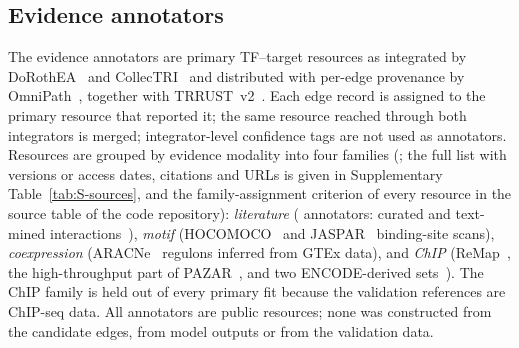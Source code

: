 

\subsection{Evidence annotators}\label{sec:data-annotators}
The evidence annotators are primary TF--target resources as integrated by DoRothEA~\citep{garcia2019benchmark} and CollecTRI~\citep{mullerdott2023collectri} and distributed with per-edge provenance by OmniPath~\citep{turei2021omnipath}, together with TRRUST~v2~\citep{han2018trrust}.
Each edge record is assigned to the primary resource that reported it; the same resource reached through both integrators is merged; integrator-level confidence tags are not used as annotators.
Resources are grouped by evidence modality into four families (; the full list with versions or access dates, citations and URLs is given in Supplementary Table~\ref{tab:S-sources}, and the family-assignment criterion of every resource in the source table of the code repository):
\emph{literature} (\nNAnnotLit{} annotators: curated and text-mined interactions~\citep{han2018trrust,vazquez2022extri,huang2019geredb,jiang2007tred,essaghir2010tfacts,bovolenta2012htridb,perfetto2016signor,chu2021curation,portales2009pazar,kanehisa2012kegg,carrascopro2018cytreg,orchard2014intact,huntley2015goa,lesurf2016oreganno,yusuf2012tfe,fantom2009transcriptional,kawaji2011fantom,gronostajski2011nfi}),
\emph{motif} (HOCOMOCO~\citep{kulakovskiy2018hocomoco} and JASPAR~\citep{khan2018jaspar} binding-site scans),
\emph{coexpression} (ARACNe~\citep{margolin2006reverse} regulons inferred from GTEx data), and
\emph{ChIP} (ReMap~\citep{cheneby2018remap}, the high-throughput part of PAZAR~\citep{portales2009pazar}, and two ENCODE-derived sets~\citep{gerstein2012architecture}).
The ChIP family is held out of every primary fit because the validation references are ChIP-seq data.
All annotators are public resources; none was constructed from the candidate edges, from model outputs or from the validation data.


